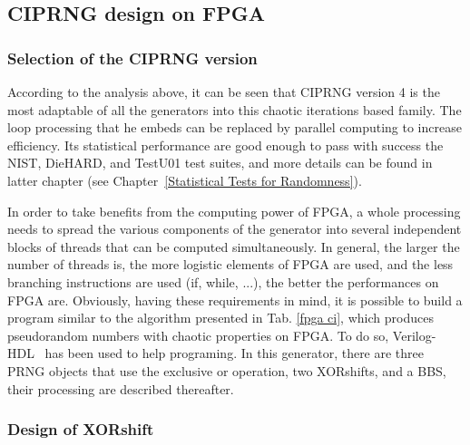 \subsection{CIPRNG design on FPGA}
\label{FPGA design}
\subsubsection{Selection of the CIPRNG version}

According to the analysis above, 
it can be seen that CIPRNG version 4 is the most adaptable of all the generators into
this chaotic iterations based family. 
The loop processing that he embeds can be replaced by parallel computing to increase  efficiency. 
Its statistical performance are good enough to pass with success the NIST, DieHARD, and TestU01 test suites, and more details can be found in latter chapter (see Chapter~\ref{Statistical Tests for Randomness}).

In order to take benefits from the computing power of FPGA, a whole processing
needs to spread the various components of the generator 
into several independent blocks  of threads that can be computed
simultaneously. In general,  the larger the number of  threads is, the
more logistic elements of FPGA are used, and the less branching  instructions are
used  (if,  while,  ...),  the  better the  performances  on  FPGA  are.
Obviously, having these requirements in  mind, it is possible to build
a program similar to the algorithm presented in Tab.
\ref{fpga ci}, which produces pseudorandom numbers with chaotic properties on FPGA.  
To do so,  Verilog-HDL~\cite{verilog} has been used to help programing. 
In this generator, there are three
PRNG objects that use the exclusive or operation, two XORshifts, and a BBS, 
their processing are described thereafter.


\subsubsection{Design of XORshift}

